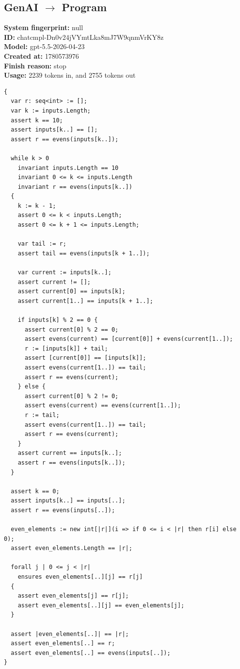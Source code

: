 \documentclass{article}
\begin{document}
\subsection*{GenAI $\rightarrow$ Program}
\textbf{System fingerprint: }null
\\\textbf{ID: }chatcmpl-Dn0v24jVYmtLka8mJ7W9qnmVrKY8z
\\\textbf{Model: }gpt-5.5-2026-04-23
\\\textbf{Created at: }1780573976
\\\textbf{Finish reason: }stop
\\\textbf{Usage: }2239 tokens in, and 2755 tokens out
\begin{lstlisting}
{
  var r: seq<int> := [];
  var k := inputs.Length;
  assert k == 10;
  assert inputs[k..] == [];
  assert r == evens(inputs[k..]);

  while k > 0
    invariant inputs.Length == 10
    invariant 0 <= k <= inputs.Length
    invariant r == evens(inputs[k..])
  {
    k := k - 1;
    assert 0 <= k < inputs.Length;
    assert 0 <= k + 1 <= inputs.Length;

    var tail := r;
    assert tail == evens(inputs[k + 1..]);

    var current := inputs[k..];
    assert current != [];
    assert current[0] == inputs[k];
    assert current[1..] == inputs[k + 1..];

    if inputs[k] % 2 == 0 {
      assert current[0] % 2 == 0;
      assert evens(current) == [current[0]] + evens(current[1..]);
      r := [inputs[k]] + tail;
      assert [current[0]] == [inputs[k]];
      assert evens(current[1..]) == tail;
      assert r == evens(current);
    } else {
      assert current[0] % 2 != 0;
      assert evens(current) == evens(current[1..]);
      r := tail;
      assert evens(current[1..]) == tail;
      assert r == evens(current);
    }
    assert current == inputs[k..];
    assert r == evens(inputs[k..]);
  }

  assert k == 0;
  assert inputs[k..] == inputs[..];
  assert r == evens(inputs[..]);

  even_elements := new int[|r|](i => if 0 <= i < |r| then r[i] else 0);
  assert even_elements.Length == |r|;

  forall j | 0 <= j < |r|
    ensures even_elements[..][j] == r[j]
  {
    assert even_elements[j] == r[j];
    assert even_elements[..][j] == even_elements[j];
  }

  assert |even_elements[..]| == |r|;
  assert even_elements[..] == r;
  assert even_elements[..] == evens(inputs[..]);
}
\end{lstlisting}
\end{document}

